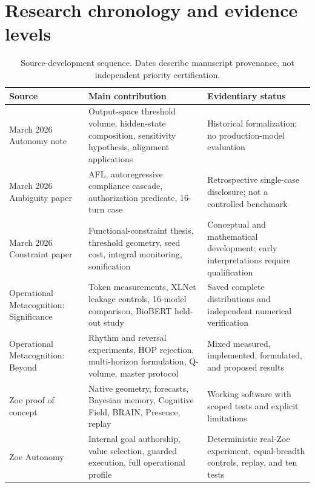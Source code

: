 \section{Research chronology and evidence levels}
\begin{table}[htbp]
\centering
\caption{Source-development sequence. Dates describe manuscript provenance, not independent priority certification.}
\label{tab:chronology}
{\small
\begin{tabularx}{\textwidth}{p{3.0cm}X p{4.0cm}}
\toprule
Source & Main contribution & Evidentiary status \\
\midrule
March 2026 Autonomy note & Output-space threshold volume, hidden-state composition, sensitivity hypothesis, alignment applications & Historical formalization; no production-model evaluation \\
March 2026 Ambiguity paper & AFL, autoregressive compliance cascade, authorization predicate, 16-turn case & Retrospective single-case disclosure; not a controlled benchmark \\
March 2026 Constraint paper & Functional-constraint thesis, threshold geometry, seed cost, integral monitoring, sonification & Conceptual and mathematical development; early interpretations require qualification \\
Operational Metacognition: Significance & Token measurements, XLNet leakage controls, 16-model comparison, BioBERT held-out study & Saved complete distributions and independent numerical verification \\
Operational Metacognition: Beyond & Rhythm and reversal experiments, HOP rejection, multi-horizon formulation, Q-volume, master protocol & Mixed measured, implemented, formulated, and proposed results \\
Zoe proof of concept & Native geometry, forecasts, Bayesian memory, Cognitive Field, BRAIN, Presence, replay & Working software with scoped tests and explicit limitations \\
Zoe Autonomy & Internal goal authorship, value selection, guarded execution, full operational profile & Deterministic real-Zoe experiment, equal-breadth controls, replay, and ten tests \\
\bottomrule
\end{tabularx}}
\end{table}

